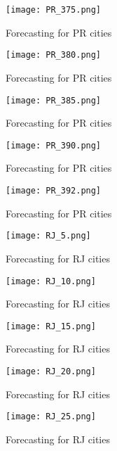  \begin{figure}[!ht] 
 \centering 
 \texttt{[image: PR\_375.png]} 
 \caption{Forecasting for PR cities } 
 \label{fig:PR_375} 
 \end{figure} 
 
 \begin{figure}[!ht] 
 \centering 
 \texttt{[image: PR\_380.png]} 
 \caption{Forecasting for PR cities } 
 \label{fig:PR_380} 
 \end{figure} 
 
 \begin{figure}[!ht] 
 \centering 
 \texttt{[image: PR\_385.png]} 
 \caption{Forecasting for PR cities } 
 \label{fig:PR_385} 
 \end{figure} 
 
 \begin{figure}[!ht] 
 \centering 
 \texttt{[image: PR\_390.png]} 
 \caption{Forecasting for PR cities } 
 \label{fig:PR_390} 
 \end{figure} 
 
 \begin{figure}[!ht] 
 \centering 
 \texttt{[image: PR\_392.png]} 
 \caption{Forecasting for PR cities } 
 \label{fig:PR_392} 
 \end{figure} 
 
 \begin{figure}[!ht] 
 \centering 
 \texttt{[image: RJ\_5.png]} 
 \caption{Forecasting for RJ cities } 
 \label{fig:RJ_5} 
 \end{figure} 
 
 \begin{figure}[!ht] 
 \centering 
 \texttt{[image: RJ\_10.png]} 
 \caption{Forecasting for RJ cities } 
 \label{fig:RJ_10} 
 \end{figure} 
 
 \begin{figure}[!ht] 
 \centering 
 \texttt{[image: RJ\_15.png]} 
 \caption{Forecasting for RJ cities } 
 \label{fig:RJ_15} 
 \end{figure} 
 
 \begin{figure}[!ht] 
 \centering 
 \texttt{[image: RJ\_20.png]} 
 \caption{Forecasting for RJ cities } 
 \label{fig:RJ_20} 
 \end{figure} 
 
 \begin{figure}[!ht] 
 \centering 
 \texttt{[image: RJ\_25.png]} 
 \caption{Forecasting for RJ cities } 
 \label{fig:RJ_25} 
 \end{figure} 
 
